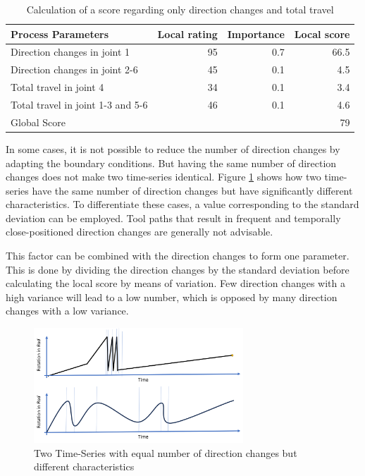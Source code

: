 \begin{table}[H]
	\centering
	\begin{tabular}{||l|r|r|r||}
		Process Parameters & Local rating & Importance & Local score\\
		\hline
		\hline
		\hline
		
		Direction changes in joint 1 & 95 & 0.7 & 66.5\\
		Direction changes in joint 2-6 & 45& 0.1&4.5\\
		Total travel in joint 4& 34& 0.1&3.4\\
		Total travel in joint 1-3 and 5-6& 46&0.1&4.6\\
		\hline
		\hline
		\hline
		Global Score& & &79\\
		\hline
		\hline
	\end{tabular}
	
	\caption{Calculation of a score regarding only direction changes and total travel}
	\label{exampleDirTravel}
\end{table}

In some cases, it is not possible to reduce the number of direction changes by adapting the boundary conditions. But having the same number of direction changes does not make two time-series identical. Figure \ref{dirchangeSTD} shows how two time-series have the same number of direction changes but have significantly different characteristics. To differentiate these cases, a value corresponding to the standard deviation can be employed. Tool paths that result in frequent and temporally close-positioned direction changes are generally not advisable. 


This factor can be combined with the direction changes to form one parameter. This is done by dividing the direction changes by the standard deviation before calculating the local score by means of variation. Few direction changes with a high variance will lead to a low number, which is opposed by many direction changes with a low variance.

\begin{figure}[H]
	\centerline{\includegraphics[width=0.7\textwidth]{figures/DirSTD.png}}
	\caption{Two Time-Series with equal number of direction changes but different characteristics}
	\label{dirchangeSTD}
\end{figure}

